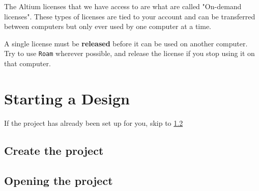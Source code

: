 \documentclass[12pt,a4paper]{article}
\begin{document}
The Altium licenses that we have access to are what are called "On-demand licenses". These types of licenses are tied to your account and can be transferred between computers but only ever used by one computer at a time.

\begin{important}
    A single license must be \textbf{released} before it can be used on another computer. Try to use \verb|Roam| wherever possible, and release the license if you stop using it on that computer.
  \end{important}

\newpage
\section{Starting a Design}
If the project has already been set up for you, skip to \ref{opnProj}
\subsection{Create the project}
\subsection{Opening the project}
\label{opnProj}
\end{document}
